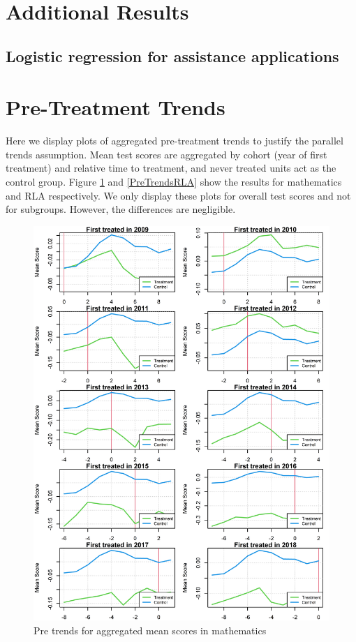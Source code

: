 
\section{Additional Results} \label{AppendixA}

\subsection{Logistic regression for assistance applications}





\section{Pre-Treatment Trends} \label{PreTrends}

Here we display plots of aggregated pre-treatment trends to justify the parallel trends assumption. Mean test scores are aggregated by cohort (year of first treatment) and relative time to treatment, and never treated units act as the control group. Figure \ref{PreTrendsMath} and \ref{PreTrendsRLA} show the results for mathematics and RLA respectively. We only display these plots for overall test scores and not for subgroups. However, the differences are negligible.


\begin{figure}[!h]
	\centering
	\includegraphics[scale=1]{"../Code & Data/ParTrendsPlotMathematics.png"}
	\caption{Pre trends for aggregated mean scores in mathematics}
	\label{PreTrendsMath}
\end{figure}

